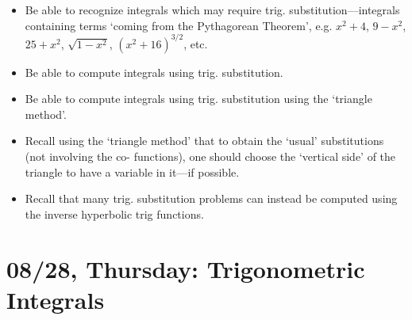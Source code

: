 \documentclass[11pt,letterpaper]{article}
\begin{document}
\begin{itemize}
\item Be able to recognize integrals which may require trig. substitution---integrals containing terms `coming from the Pythagorean Theorem', e.g. $x^2 + 4$, $9 - x^2$, $25 + x^2$, $\sqrt{1 - x^2}$, $(x^2 + 16)^{3/2}$, etc.

\item Be able to compute integrals using trig. substitution. 

\item Be able to compute integrals using trig. substitution using the `triangle method'. 

\item Recall using the `triangle method' that to obtain the `usual' substitutions (not involving the co- functions), one should choose the `vertical side' of the triangle to have a variable in it---if possible.

\item Recall that many trig. substitution problems can instead be computed using the inverse hyperbolic trig functions. 
\end{itemize}

\newpage
\section*{08/28, Thursday: Trigonometric Integrals\label{08-28}}
\end{document}
